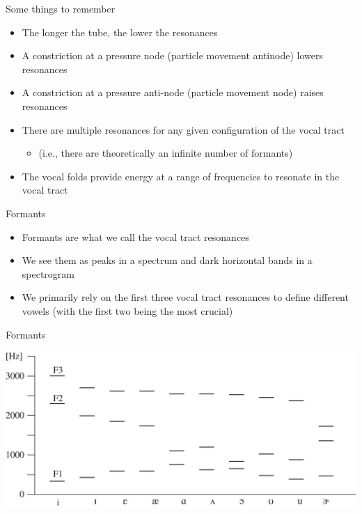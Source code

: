 \documentclass[professionalfonts]{beamer}
\begin{document}
\begin{frame}{Some things to remember}
    \begin{itemize}
        \item The longer the tube, the lower the resonances
        \item A constriction at a pressure node (particle movement antinode) lowers resonances
        \item A constriction at a pressure anti-node (particle movement node) raises resonances
        \item There are multiple resonances for any given configuration of the vocal tract 
        \begin{itemize}
            \item (i.e., there are theoretically an infinite number of formants)
        \end{itemize}
        \item The vocal folds provide energy at a range of frequencies to resonate in the vocal tract
    \end{itemize}
\end{frame}

\begin{frame}{Formants}
    \begin{itemize}
        \item Formants are what we call the vocal tract resonances
        \item We see them as peaks in a spectrum and dark horizontal bands in a spectrogram
        \item We primarily rely on the first three vocal tract resonances to define different vowels (with the first two being the most crucial)
    \end{itemize}
\end{frame}

\begin{frame}{Formants}
    \begin{center}
        \includegraphics[width=\textwidth]{figs/rj-c10f002.jpg}
    \end{center}
\end{frame}
\end{document}
